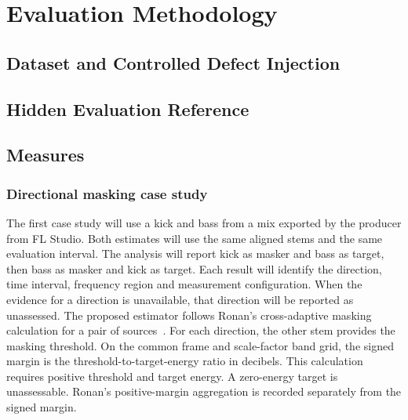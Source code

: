 \chapter{Evaluation Methodology}
\label{ch:evaluation}

\section{Dataset and Controlled Defect Injection}
\label{sec:eval-dataset}

\section{Hidden Evaluation Reference}
\label{sec:eval-hidden}

\section{Measures}
\label{sec:eval-measures}

\subsection{Directional masking case study}
\label{sec:eval-masking-case}
The first case study will use a kick and bass from a mix exported by the producer from FL Studio. Both estimates will use the same aligned stems and the same evaluation interval. The analysis will report kick as masker and bass as target, then bass as masker and kick as target. Each result will identify the direction, time interval, frequency region and measurement configuration. When the evidence for a direction is unavailable, that direction will be reported as unassessed. The proposed estimator follows Ronan's cross-adaptive masking calculation for a pair of sources~\cite[Sec.~7.2.4.2, Eqs.~7.11--7.13]{Ronan2018Thesis}. For each direction, the other stem provides the masking threshold. On the common frame and scale-factor band grid, the signed margin is the threshold-to-target-energy ratio in decibels. This calculation requires positive threshold and target energy. A zero-energy target is unassessable. Ronan's positive-margin aggregation is recorded separately from the signed margin.

